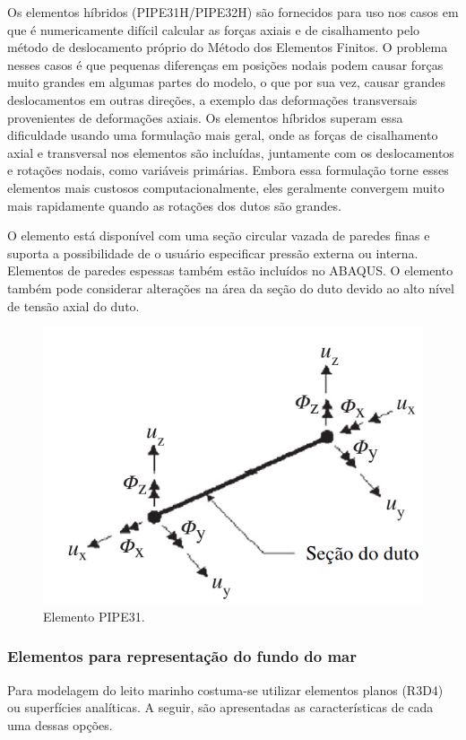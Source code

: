 Os elementos híbridos (PIPE31H/PIPE32H) são fornecidos para uso nos casos em que é numericamente difícil calcular as forças axiais e de cisalhamento pelo método de deslocamento próprio do Método dos Elementos Finitos.
O problema nesses casos é que pequenas diferenças em posições nodais podem causar forças muito grandes em algumas partes do modelo, o que por sua vez, causar grandes deslocamentos em outras direções, a exemplo das deformações transversais provenientes de deformações axiais.
Os elementos híbridos superam essa dificuldade usando uma formulação mais geral, onde as forças de cisalhamento axial e transversal nos elementos são incluídas, juntamente com os deslocamentos e rotações nodais, como variáveis primárias.
Embora essa formulação torne esses elementos mais custosos computacionalmente, eles geralmente convergem muito mais rapidamente quando as rotações dos dutos são grandes.

O elemento está disponível com uma seção circular vazada de paredes finas e suporta a possibilidade de o usuário especificar pressão externa ou interna.
Elementos de paredes espessas também estão incluídos no ABAQUS\@.
O elemento também pode considerar alterações na área da seção do duto devido ao alto nível de tensão axial do duto.

\begin{figure}[!ht]
    \centering
    \caption{Elemento PIPE31.}\label{fig:elemen_PIPE31H}
    \includegraphics[width=0.5\linewidth]{imagens/elemen_PIPE31H}
\end{figure}


\subsubsection{Elementos para representação do fundo do mar}


Para modelagem do leito marinho costuma-se utilizar elementos planos (R3D4) ou superfícies analíticas. A seguir, são apresentadas as características de cada uma dessas opções.


